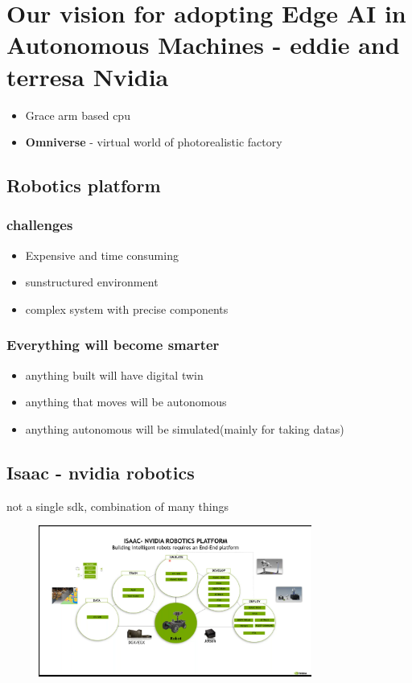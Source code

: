 \documentclass[a4paper]{article}
\begin{document}
\section{Our vision for adopting Edge AI in Autonomous Machines - eddie and terresa Nvidia}
\begin{itemize}
    \item Grace arm based cpu
    \item \textbf{Omniverse} - virtual world of photorealistic factory
\end{itemize}
\subsection{Robotics platform}
\subsubsection{challenges}
\begin{itemize}
    \item Expensive and time consuming
    \item sunstructured environment
    \item complex system with precise components
\end{itemize}
\subsubsection{Everything will become smarter}
\begin{itemize}
    \item anything built will have digital twin
    \item anything that moves will be autonomous
    \item anything autonomous will be simulated(mainly for taking datas)
\end{itemize}
\subsection{Isaac - nvidia robotics}
not a single sdk, combination of many things
\begin{figure}[H]
         \centering
         \includegraphics[width=0.8\textwidth]{issac.png}
         \caption{}
         \label{fig:}
     \end{figure}
\end{document}
